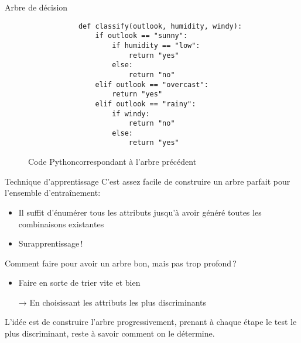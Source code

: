 \documentclass[../allslides.tex]{subfiles}
\begin{document}
\begin{frame}[fragile]{Arbre de décision}
    \begin{figure}
        \begin{verbatim}
            def classify(outlook, humidity, windy):
                if outlook == "sunny":
                    if humidity == "low":
                        return "yes"
                    else:
                        return "no"
                elif outlook == "overcast":
                    return "yes"
                elif outlook == "rainy":
                    if windy:
                        return "no"
                    else:
                        return "yes"
        \end{verbatim}    
        \caption{Code Pythoncorrespondant à l'arbre précédent}
    \end{figure}
\end{frame}

\begin{frame}{Technique d'apprentissage}
    C'est assez facile de construire un arbre parfait pour l'ensemble d'entraînement:

    \begin{itemize}
        \item<+-> Il suffit d'énumérer tous les attributs jusqu'à avoir généré toutes les combinaisons existantes
        \item<+->[→] Surapprentissage ! %
    \end{itemize}
	\itpause
    Comment faire pour avoir un arbre bon, mais pas trop profond ?
    \pause
    \begin{itemize}
        \item Faire en sorte de trier vite et bien
        \item[→] En choisissant les attributs les plus discriminants
    \end{itemize}
    L'idée est de construire l'arbre progressivement, prenant à chaque étape le test le plus \alert{discriminant}, reste à savoir comment on le détermine.
\end{frame}
\end{document}
